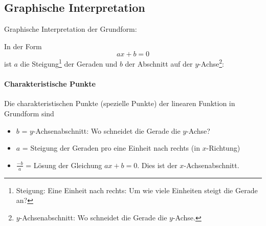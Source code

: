 

\newpage
\subsection{Graphische Interpretation}
Graphische Interpretation der Grundform:

In der Form
$$ax+b=0$$
ist $a$ die Steigung\footnote{Steigung: Eine Einheit nach rechts: Um wie viele Einheiten steigt die Gerade an?} der Geraden und $b$ der Abschnitt auf der $y$-Achse\footnote{$y$-Achsenabschnitt: Wo schneidet die Gerade die $y$-Achse.}:


  \paragraph{Charakteristische Punkte}
  Die charakteristischen Punkte (spezielle Punkte) der linearen
  Funktion in Grundform sind

  \begin{itemize}
  \item $b$ = $y$-Achsenabschnitt: Wo schneidet die Gerade die $y$-Achse?
  \item $a$ = Steigung der Geraden pro eine Einheit nach rechts (in $x$-Richtung)
  \item $\frac{-b}{a}$ = Lösung der Gleichung $ax+b=0$. Dies ist der $x$-Achsenabschnitt.
  \end{itemize}

